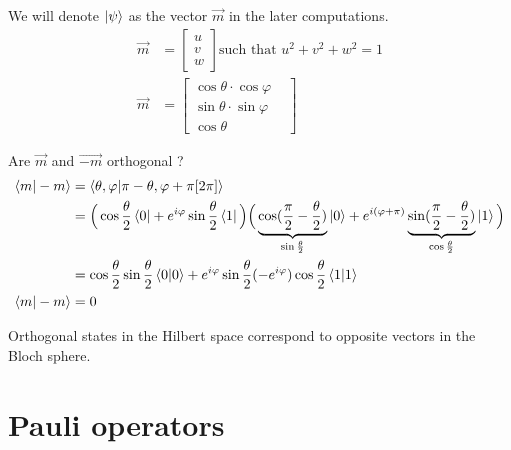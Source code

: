 \documentclass{article}
\begin{document}
We will denote $\ket{\psi}$ as the vector $\vec{m}$ in the later computations.
\begin{equation}
    \begin{aligned}
        \vec{m} & = \begin{bmatrix}
            u \\ v \\ w
        \end{bmatrix} \text{such that } u^2 + v^2 + w^2 = 1 \\
        \vec{m} & =
        \begin{bmatrix}
            \label{def-vect-m}
            \cos \theta \cdot \cos \varphi \\
            \sin \theta \cdot \sin \varphi \\
            \cos \theta &
        \end{bmatrix}
    \end{aligned}
\end{equation}

Are $\vec{m}$ and $\vec{-m}$ orthogonal ?
\begin{equation}
    \label{m-m-orthogonal}
    \begin{aligned} %
        \braket{m|-m}
            & = \braket{\theta,\varphi|\pi-\theta,\varphi+\pi[2\pi]} \\
            & = \Big(\cos\frac{\theta}{2}\bra{0}+e^{i\varphi}\sin\frac{\theta}{2}\bra{1}\Big)
                \Big(\underbrace{\cos(\frac{\pi}{2}-\frac{\theta}{2})}_{\sin\frac{\theta}{2}}\ket{0}+e^{i(\varphi+\pi)}
                \underbrace{\sin(\frac{\pi}{2}-\frac{\theta}{2})}_{\cos\frac{\theta}{2}}\ket{1}\Big) \\
            & = \cos\frac{\theta}{2}\sin\frac{\theta}{2}\braket{0|0}
                +e^{i\varphi}\sin\frac{\theta}{2}(-e^{i\varphi})\cos\frac{\theta}{2}\braket{1|1} \\
        \braket{m|-m}
            & = 0
    \end{aligned}
\end{equation}

Orthogonal states in the Hilbert space correspond to opposite vectors in the Bloch sphere.

\section{Pauli operators}
\end{document}
